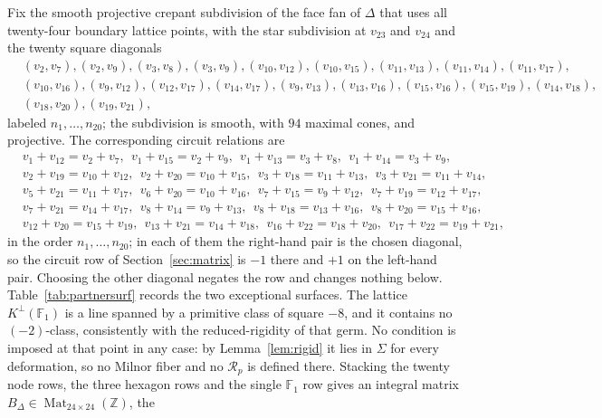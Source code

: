 \documentclass[11pt]{amsart}
\theoremstyle{definition}
\theoremstyle{remark}
\theoremstyle{plain}
\newcommand{\ZZ}{\mathbb{Z}}
\newcommand{\Rsm}{\mathcal{R}}   %
\begin{document}
Fix the smooth projective crepant subdivision of the face fan of
$\Delta$ that uses all twenty-four boundary lattice points, with the
star subdivision at $v_{23}$ and $v_{24}$ and the twenty square
diagonals
\[
\begin{aligned}
&(v_2,v_7),(v_2,v_9),(v_3,v_8),(v_3,v_9),(v_{10},v_{12}),
(v_{10},v_{15}),(v_{11},v_{13}),(v_{11},v_{14}),(v_{11},v_{17}),\\
&(v_{10},v_{16}),(v_9,v_{12}),(v_{12},v_{17}),(v_{14},v_{17}),
(v_9,v_{13}),(v_{13},v_{16}),(v_{15},v_{16}),(v_{15},v_{19}),
(v_{14},v_{18}),\\
&(v_{18},v_{20}),(v_{19},v_{21}),
\end{aligned}
\]
labeled $n_1,\dots,n_{20}$; the subdivision is smooth, with $94$
maximal cones, and projective.  The corresponding circuit
relations are
\[
\begin{aligned}
&v_1{+}v_{12}=v_2{+}v_7,\ \
v_1{+}v_{15}=v_2{+}v_9,\ \
v_1{+}v_{13}=v_3{+}v_8,\ \
v_1{+}v_{14}=v_3{+}v_9,\\
&v_2{+}v_{19}=v_{10}{+}v_{12},\ \
v_2{+}v_{20}=v_{10}{+}v_{15},\ \
v_3{+}v_{18}=v_{11}{+}v_{13},\ \
v_3{+}v_{21}=v_{11}{+}v_{14},\\
&v_5{+}v_{21}=v_{11}{+}v_{17},\ \
v_6{+}v_{20}=v_{10}{+}v_{16},\ \
v_7{+}v_{15}=v_9{+}v_{12},\ \
v_7{+}v_{19}=v_{12}{+}v_{17},\\
&v_7{+}v_{21}=v_{14}{+}v_{17},\ \
v_8{+}v_{14}=v_9{+}v_{13},\ \
v_8{+}v_{18}=v_{13}{+}v_{16},\ \
v_8{+}v_{20}=v_{15}{+}v_{16},\\
&v_{12}{+}v_{20}=v_{15}{+}v_{19},\ \
v_{13}{+}v_{21}=v_{14}{+}v_{18},\ \
v_{16}{+}v_{22}=v_{18}{+}v_{20},\ \
v_{17}{+}v_{22}=v_{19}{+}v_{21},
\end{aligned}
\]
in the order $n_1,\dots,n_{20}$; in each of them the right-hand pair
is the chosen diagonal, so the circuit row of
Section~\ref{sec:matrix} is $-1$ there and $+1$ on the left-hand pair.
Choosing the other diagonal negates the row and changes nothing
below.
Table~\ref{tab:partnersurf} records the two exceptional surfaces.  The
lattice $K^{\perp}(\mathbb F_1)$ is a line spanned by a primitive
class of square $-8$, and it contains no $(-2)$-class, consistently
with the reduced-rigidity of that germ.  No condition is imposed at
that point in any case: by Lemma~\ref{lem:rigid} it lies in $\Sigma$
for every deformation, so no Milnor fiber and no $\Rsm_p$ is defined
there.  Stacking the twenty node rows, the three hexagon rows and
the single $\mathbb F_1$ row gives an integral
matrix $B_{\Delta}\in\operatorname{Mat}_{24\times24}(\ZZ)$, the
\end{document}
